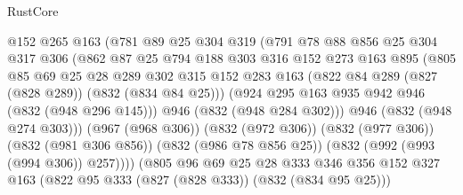 \begin{lexlean}{RustCore}
\begin{coremodule}
                            @152
                            @265
                            @163
                            (@781
                              @89
                              @25
                              @304
                              @319
                              (@791
                                @78
                                @88
                                @856
                                @25
                                @304
                                @317
                                @306
                                (@862
                                  @87
                                  @25
                                  @794
                                  @188
                                  @303
                                  @316
                                  @152
                                  @273
                                  @163
                                  @895
                                  (@805
                                    @85
                                    @69
                                    @25
                                    @28
                                    @289
                                    @302
                                    @315
                                    @152
                                    @283
                                    @163
                                    (@822 @84 @289 (@827 (@828 @289)) (@832 (@834 @84 @25)))
                                    (@924 @295 @163 @935 @942 @946 (@832 (@948 @296 @145)))
                                    @946
                                    (@832 (@948 @284 @302)))
                                  @946
                                  (@832 (@948 @274 @303)))
                                (@967 (@968 @306))
                                (@832 (@972 @306))
                                (@832 (@977 @306))
                                (@832 (@981 @306 @856))
                                (@832 (@986 @78 @856 @25))
                                (@832 (@992 (@993 (@994 @306)) @257))))
                            (@805
                              @96
                              @69
                              @25
                              @28
                              @333
                              @346
                              @356
                              @152
                              @327
                              @163
                              (@822 @95 @333 (@827 (@828 @333)) (@832 (@834 @95 @25)))

\end{coremodule}
\end{lexlean}
